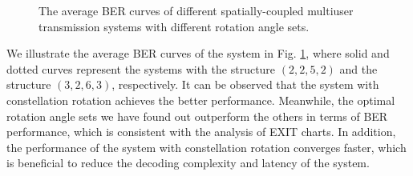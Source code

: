 \documentclass[conference]{IEEEtran}
\begin{document}
\begin{figure}[h!]
\vspace{-1em}
\setlength{\abovecaptionskip}{0.cm}
\setlength{\belowcaptionskip}{-0.cm}
  \caption{The average BER curves of different spatially-coupled multiuser transmission systems with different rotation angle sets.}\label{fig.8}
    \vspace{-1em}
\end{figure}
We illustrate the average BER curves of the system in Fig. \ref{fig.8}, where solid and dotted curves represent the systems with the structure $\left( {2,2,5,2} \right)$ and the structure $\left( {3,2,6,3} \right)$, respectively. It can be observed that the system with constellation rotation achieves the better performance. Meanwhile, the optimal rotation angle sets we have found out outperform the others in terms of BER performance, which is consistent with the analysis of EXIT charts. In addition, the performance of the system with constellation rotation converges faster, which is beneficial to reduce the decoding complexity and latency of the system.
\end{document}
